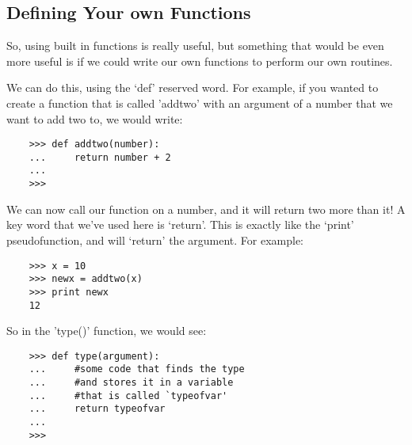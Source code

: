 \subsection{Defining Your own Functions}

So, using built in functions is really useful, but something that would be even
more useful is if we could write our own functions to perform our own routines.

We can do this, using the `def' reserved word. For example, if you wanted to
create a function that is called 'addtwo' with an argument of a number that we
want to add two to, we would write:

\begin{lstlisting}
    >>> def addtwo(number):
    ...     return number + 2
    ...
    >>>
\end{lstlisting}

We can now call our function on a number, and it will return two more than it!
A key word that we've used here is `return'. This is exactly like the `print'
pseudofunction, and will `return' the argument. For example:

\begin{lstlisting}
    >>> x = 10
    >>> newx = addtwo(x)
    >>> print newx
    12
\end{lstlisting}

So in the 'type()' function, we would see:

\begin{lstlisting}
    >>> def type(argument):
    ...     #some code that finds the type 
    ...     #and stores it in a variable
    ...     #that is called `typeofvar'
    ...     return typeofvar
    ...
    >>>
\end{lstlisting}


